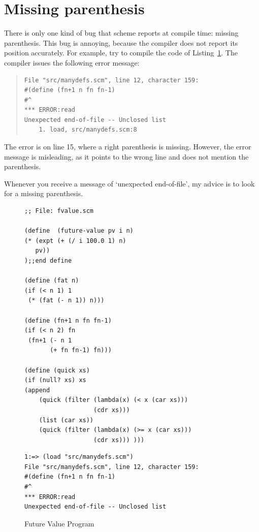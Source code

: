 \documentclass[a4paper,12pt]{book}
\newenvironment{fmpage}[1]
           {\begin{lrbox}{\fmbox}\begin{minipage}{#1}}
           {\end{minipage}\end{lrbox}\fbox{\usebox{\fmbox}}}
\begin{document}
\section{Missing parenthesis}
There is only one kind of bug that scheme
reports at compile
time: missing parenthesis.
This bug  is annoying, because the compiler
does not  report its position accurately.
For example, try to compile the code of Listing~\ref{missing-semiColon}.
The compiler issues the
following error message:
\begin{quote}
\begin{verbatim}
File "src/manydefs.scm", line 12, character 159:
#(define (fn+1 n fn fn-1)
#^
*** ERROR:read
Unexpected end-of-file -- Unclosed list
    1. load, src/manydefs.scm:8
\end{verbatim}
\end{quote}
The error is on line 15, where a right parenthesis is missing.
However,  the error message is misleading,
as it points to the wrong line and does not mention
the parenthesis.

Whenever you receive a message
of `unexpected end-of-file', my advice is to
look for a missing parenthesis.


\begin{figure}[!h]
\begin{fmpage}{0.8\textwidth}
\begin{verbatim}
;; File: fvalue.scm

(define  (future-value pv i n)
(* (expt (+ (/ i 100.0 1) n) 
   pv))
);;end define

(define (fat n)
(if (< n 1) 1
 (* (fat (- n 1)) n)))

(define (fn+1 n fn fn-1)
(if (< n 2) fn
 (fn+1 (- n 1
       (+ fn fn-1) fn)))

(define (quick xs)
(if (null? xs) xs
(append
    (quick (filter (lambda(x) (< x (car xs)))
                   (cdr xs)))
    (list (car xs))
    (quick (filter (lambda(x) (>= x (car xs)))
                   (cdr xs))) )))
\end{verbatim}
\end{fmpage}

\begin{fmpage}{0.8\textwidth}
\begin{verbatim}
1:=> (load "src/manydefs.scm")
File "src/manydefs.scm", line 12, character 159:
#(define (fn+1 n fn fn-1)
#^
*** ERROR:read
Unexpected end-of-file -- Unclosed list
\end{verbatim}
\end{fmpage}
\caption{Future Value Program}
\label{missing-semiColon}
\end{figure}
\end{document}
